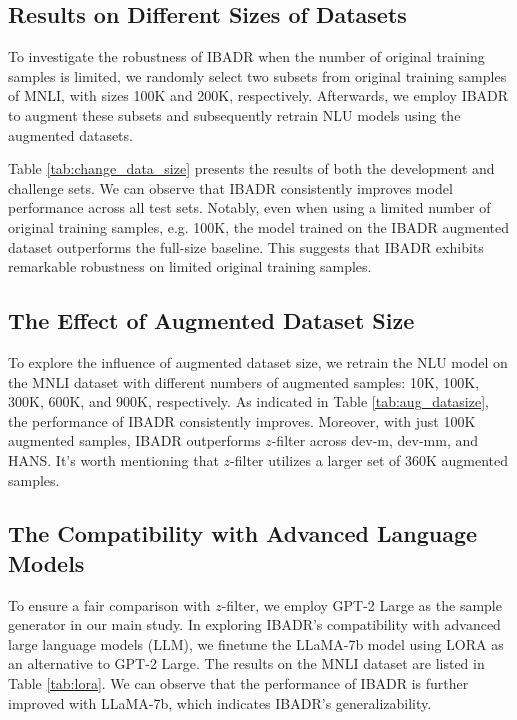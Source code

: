 \documentclass[11pt]{article}
\def\model{\textsc{IBADR}\xspace}
\begin{document}
\subsection{Results on Different Sizes of Datasets}
To investigate the robustness of \model when the number of original training samples is limited, we randomly select two subsets from original training samples of MNLI, with sizes 100K and 200K, respectively. Afterwards, we employ \model to augment these subsets and subsequently retrain NLU models using the augmented datasets.

Table \ref{tab:change_data_size} presents the results of both the development and challenge sets. We can observe that \model consistently improves model performance across all test sets. Notably, even when using a limited number of original training samples, e.g. 100K, the model trained on the \model augmented dataset outperforms the full-size baseline. This suggests that \model exhibits remarkable robustness on limited original training samples.


\subsection{The Effect of Augmented Dataset Size}
To explore the influence of augmented dataset size, we retrain the NLU model on the MNLI dataset with different numbers of augmented samples: 10K, 100K, 300K, 600K, and 900K, respectively. As indicated in Table \ref{tab:aug_datasize}, the performance of \model consistently improves. Moreover, with just 100K augmented samples, \model outperforms $z$-filter across dev-m, dev-mm, and HANS. It's worth mentioning that $z$-filter utilizes a larger set of 360K augmented samples.


\subsection{The Compatibility with Advanced Language Models}
\label{apdx:lora}
To ensure a fair comparison with $z$-filter, we employ GPT-2 Large as the sample generator in our main study. In exploring \model's compatibility with advanced large language models (LLM), we finetune the LLaMA-7b model \cite{llama} using LORA \cite{hu2021lora} as an alternative to GPT-2 Large. The results on the MNLI dataset are listed in Table \ref{tab:lora}. We can observe that the performance of \model is further improved with LLaMA-7b, which indicates \model's generalizability.
\end{document}
